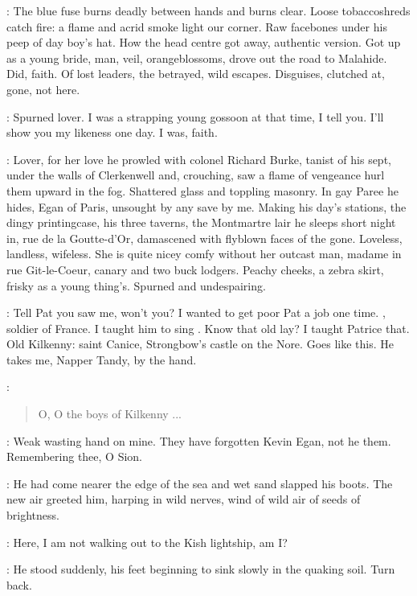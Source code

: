 \StephenInt:
The blue fuse burns deadly between hands and burns clear.
Loose tobaccoshreds catch fire:
a flame and acrid smoke light our corner.
Raw facebones under his peep of day boy's hat.
How the head centre got away,
authentic version.
Got up as a young bride,
man, veil, orangeblossoms,
drove out the road to Malahide.
Did, faith.
Of lost leaders, the betrayed, wild escapes.
Disguises, clutched at, gone, not here.

\kevin:
Spurned lover.
I was a strapping young gossoon at that time, I tell you.
I'll show you my likeness one day.
I was, faith.

\StephenInt:
Lover,
for her love
he prowled with colonel Richard Burke,
tanist of his sept,
under the walls of Clerkenwell
and, crouching,
saw a flame of vengeance hurl them upward in the fog.
Shattered glass and toppling masonry.
In gay Paree he hides,
Egan of Paris,
unsought by any save by me.
Making his day's stations,
the dingy printingcase,
his three taverns,
the Montmartre lair he sleeps short night in,
rue de la Goutte-d'Or,
damascened with flyblown faces of the gone.
Loveless, landless, wifeless.
She is quite nicey comfy without her outcast man,
madame in rue Git-le-Coeur,
canary and two buck lodgers.
Peachy cheeks, a zebra skirt, frisky as a young thing's.
Spurned and undespairing.

\mrsegan:
Tell Pat you saw me, won't you?
I wanted to get poor Pat a job one time.
, soldier of France.
I taught him to sing
.
Know that old lay?
I taught Patrice that.
Old Kilkenny:
saint Canice, Strongbow's castle on the Nore.
Goes like this.
He takes me, Napper Tandy, by the hand.

\mrsegan:
\begin{verse}
    O, O the boys of Kilkenny ...
\end{verse}

\StephenInt:
Weak wasting hand on mine.
They have forgotten Kevin Egan,
not he them.
Remembering thee, O Sion.

:
He had come nearer the edge of the sea and wet sand slapped his boots.
The new air greeted him, harping in wild nerves,
wind of wild air
of seeds of brightness.

\StephenInt:
Here,
I am not walking out to the Kish lightship,
am I?

:
He stood suddenly,
his feet beginning to sink slowly in the quaking soil.
Turn back.

